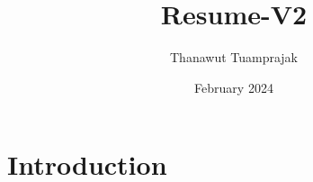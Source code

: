 \documentclass{article}
\title{Resume-V2}
\author{Thanawut Tuamprajak}
\date{February 2024}
\begin{document}
\maketitle

\section{Introduction}
\end{document}
